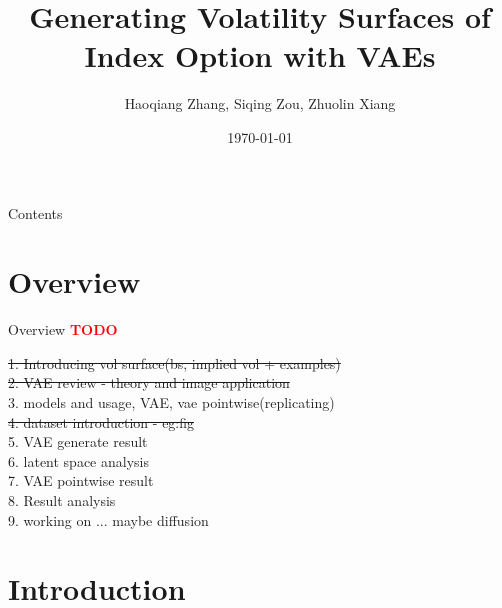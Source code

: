 \documentclass{beamer}
\title{Generating Volatility Surfaces of Index Option with VAEs}
\author{Haoqiang Zhang, Siqing Zou, Zhuolin Xiang}
\date{\today}
\newcommand\todo{\textcolor{red}{\textbf{TODO}}}
\begin{document}
\maketitle

\begin{frame}{Contents}
    \tableofcontents
\end{frame}

\section{Overview}
\begin{frame}{Overview}
\todo

\st{1. Introducing vol surface(bs, implied vol + examples)} \\
\st{2. VAE review - theory and image application}\\
3. models and usage, VAE, vae pointwise(replicating)\\
\st{4. dataset introduction - eg:fig}\\
5. VAE generate result \\
6. latent space analysis\\
7. VAE pointwise result\\
8. Result analysis\\
9. working on ... maybe diffusion\\

\end{frame}

\section{Introduction}



    
\end{document}
